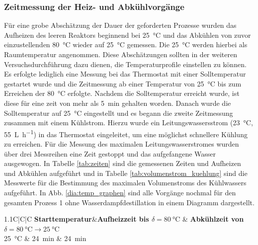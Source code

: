 \subsubsection*{Zeitmessung der Heiz- und Abkühlvorgänge}
Für eine grobe Abschätzung der Dauer der geforderten Prozesse wurden das Aufheizen des leeren Reaktors beginnend bei \SI{25}{\celsius} und das Abkühlen von zuvor einzustellenden \SI{80}{\celsius} wieder auf \SI{25}{\celsius} gemessen. Die \SI{25}{\celsius} werden hierbei als Raumtemperatur angenommen. Diese Abschätzungen sollten in der weiteren Versuchsdurchführung dazu dienen, die Temperaturprofile einstellen zu können.\\
Es erfolgte lediglich eine Messung bei das Thermostat mit einer Solltemperatur gestartet wurde und die Zeitmessung ab einer Temperatur von \SI{25}{\celsius} bis zum Erreichen der \SI{80}{\celsius} erfolgte. Nachdem die Solltemperatur erreicht wurde, ist diese für eine zeit von mehr als \SI{5}{\minute} gehalten worden. Danach wurde die Solltemperatur auf \SI{25}{\celsius} eingestellt und es begann die zweite Zeitmessung zusammen mit einem Kühlstrom. Hierzu wurde ein Leitungswassersstrom (\SI{23}{\celsius}, \SI{55}{\liter\per \hour}) in das Thermostat eingeleitet, um eine möglichst schnellere Kühlung zu erreichen. Für die Messung des maximalen Leitungswasserstromes wurden über drei Messreihen eine Zeit gestoppt und das aufgefangene Wasser ausgewogen.
In Tabelle \ref{tab:zeiten} sind die gemessenen Zeiten und Aufheizen und Abkühlen aufgeführt und in Tabelle \ref{tab:volumenstrom_kuehlung} sind die Messwerte für die Bestimmung des maximalen Volumenstroms des Kühlwassers aufgeführt. In Abb. \ref{dia:temp_graphen} sind alle Vorgänge nochmal für den gesamten Prozess 1 ohne Wasserdampfdestillation in einem Diagramm dargestellt.

\begin{table}[h!]
	\renewcommand*{\arraystretch}{1.2}
	\centering
	\caption[Gemessene Dauer für Aufheiz- und Abkühlvorgänge]{Gemessene Dauer für Aufheiz- und Abkühlvorgänge mit $\delta_{\text{Start}}=\SI{25}{\celsius}$}
	\label{tab:zeiten}
	\begin{tabulary}{1.1\textwidth}{C|C|C}
		\hline
		\textbf{Starttemperatur}&\textbf{Aufheizzeit bis $\delta=\SI{80}{\celsius}$} & \textbf{Abkühlzeit von $\delta=\SI{80}{\celsius}\rightarrow\SI{25}{\celsius}$}\\
		\SI{25}{\celsius} & \SI{24}{\minute} & \SI{24}{\minute}\\
		\hline			
	\end{tabulary}
\end{table}%
\FloatBarrier



